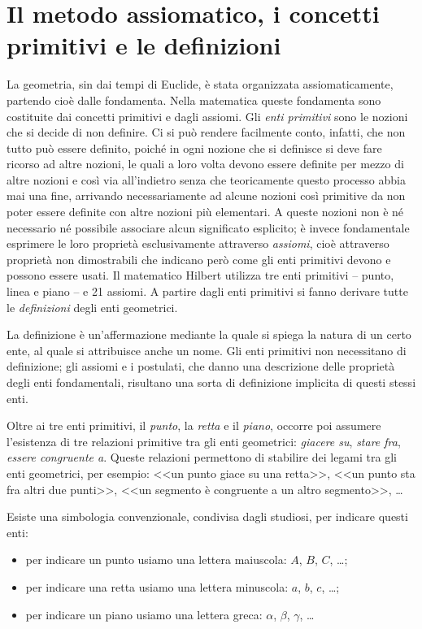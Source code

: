 \section{Il metodo assiomatico, i concetti primitivi e le 
definizioni}\label{sect:metodo_assiomatico_concetti_primitivi}
La geometria, sin dai tempi di Euclide, è stata organizzata 
assiomaticamente, partendo cioè dalle fondamenta. Nella matematica 
queste fondamenta sono costituite dai concetti primitivi e dagli 
assiomi. Gli \emph{enti primitivi} sono le nozioni che si decide di 
non definire. Ci si può rendere facilmente conto, infatti, che non 
tutto può essere definito, poiché in ogni nozione che si definisce si 
deve fare ricorso ad altre nozioni, le quali a loro volta devono 
essere definite per mezzo di altre nozioni e così via all'indietro 
senza che teoricamente questo processo abbia mai una fine, arrivando 
necessariamente ad alcune nozioni così primitive da non poter essere 
definite con altre nozioni più elementari. A queste nozioni non è né 
necessario né possibile associare alcun significato esplicito; è 
invece fondamentale esprimere le loro proprietà esclusivamente 
attraverso \emph{assiomi}, cioè attraverso proprietà non dimostrabili 
che indicano però come gli enti primitivi devono e possono essere 
usati. Il matematico Hilbert utilizza tre enti primitivi -- punto, 
linea e piano -- e 21 assiomi. A partire dagli enti primitivi si 
fanno derivare tutte le \emph{definizioni} degli enti geometrici.

La definizione è un'affermazione mediante la quale si spiega la natura di un 
certo ente, al quale si attribuisce anche un nome. Gli enti primitivi non 
necessitano di definizione; gli assiomi e i postulati, che danno una 
descrizione delle proprietà degli enti fondamentali, risultano una sorta di 
definizione implicita di questi stessi enti.

Oltre ai tre enti primitivi, il \emph{punto}, la 
\emph{retta} e il \emph{piano}, occorre poi assumere l'esistenza di 
tre relazioni primitive tra gli enti geometrici: \emph{giacere su}, 
\emph{stare fra}, \emph{essere congruente a}. Queste relazioni 
permettono di stabilire dei legami tra gli enti geometrici, per 
esempio: <<un punto giace su una retta>>, <<un punto sta fra altri 
due punti>>, <<un segmento è congruente a un altro segmento>>, \ldots

Esiste una simbologia convenzionale, condivisa dagli studiosi, per 
indicare questi enti:
\begin{itemize}
\item per indicare un punto usiamo una lettera maiuscola: $A$, $B$, 
$C$, \ldots;
\item per indicare una retta usiamo una lettera minuscola: $a$, $b$, 
$c$, \ldots;
\item per indicare un piano usiamo una lettera greca: $\alpha$, 
$\beta$, $\gamma$, \ldots
\end{itemize}

